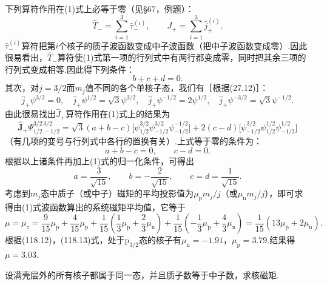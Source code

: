 \begin{xiti}
下列算符作用在(1)式上必等于零（见§67，例题）：
\begin{equation*}
  \hat{T}_-=\sum_{i=1}^{3}\hat{\tau}_-^{(i)},\qquad
  J_+=\sum_{i=1}^{3}\hat{j}_+^{(i)}.
\end{equation*}
$\hat{\tau}_-^{(i)}$算符把第$i$个核子的质子波函数变成中子波函数（把中子波函数变成零）.因此很易看出，$\hat{T}_-$算符使(1)式第一项的行列式中有两行都变成零，同时把其余三项的行列式变成相等.因此得下列条件：
\begin{equation*}
  b+c+d=0.
\end{equation*}
其次，对$j=3/2$而$m_j$值不同的各个单核子态，我们有［根据(27.12)］：
\begin{equation*}
  \hat{j}_+\psi^{3/2}=0,\quad
  \hat{j}_+\psi^{1/2}=\sqrt{3}\psi^{3/2},\quad
  \hat{j}_+\psi^{-1/2}=2\psi^{1/2},\quad
  \hat{j}_+\psi^{-3/2}=\sqrt{3}\psi^{-1/2}.
\end{equation*}
由此很易找出$\hat{J}_+$算符作用在(1)式上的结果为
\begin{equation*}
  \hat{\boldsymbol{J}}_+\varPsi^{3/2\,3/2}_{1/2\,-1/2}
  =\sqrt{3}\left(a+b-c\right)
  \big[\psi^{3/2}_{1/2}\psi^{3/2}_{-1/2}\psi^{-1/2}_{-1/2}\big]
  +2\left(c-d\right)
  \big[\psi^{3/2}_{-1/2}\psi^{1/2}_{1/2}\psi^{1/2}_{-1/2}\big]
\end{equation*}
（有几项的变号与行列式中各行的置换有关）.上式等于零的条件为：
\begin{equation*}
  a+b-c=0,\qquad c-d=0.
\end{equation*}
根据以上诸条件再加上(1)式的归一化条件，可得出
\begin{equation*}
  a=\frac{3}{\sqrt{15}},\qquad
  b=-\frac{2}{\sqrt{15}},\qquad
  c=d=\frac{1}{\sqrt{15}}.
\end{equation*}
考虑到$m_j$态中质子（或中子）磁矩的平均投影值为$\mu_\mathrm{p}m_j/j$（或$\mu_\mathrm{n}m_j/j$），即可求得由(1)式波函数算出的系统磁矩平均值，它等于
\begin{equation*}
  \mu=\bar{\mu}_z=\frac{9}{15}\mu_\mathrm{p}+\frac{4}{15}\mu_\mathrm{p}
  +\frac{1}{15}\left(\frac{1}{3}\mu_\mathrm{p}+\frac{2}{3}\mu_\mathrm{n}\right)
  +\frac{1}{15}\left(-\frac{1}{3}\mu_\mathrm{p}+\frac{4}{3}\mu_\mathrm{n}\right)
  =\frac{1}{15}\left(13\mu_\mathrm{p}+2\mu_\mathrm{n}\right).
\end{equation*}
根据(118.12)，(118.13)式，处于$\mathrm{p}_{3/2}$态的核子有$\mu_\mathrm{n}=-1.91$，$\mu_\mathrm{p}=3.79$.结果得$\mu=3.03$.

\quad 设满壳层外的所有核子都属于同一态，并且质子数等于中子数，求核磁矩.


\end{xiti}
